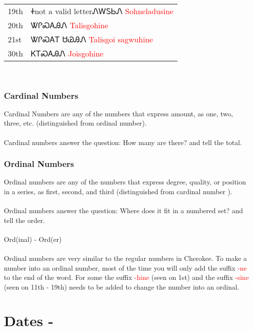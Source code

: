 \vfill\newpage\begin{minipage}{\linewidth}\begin{tabular}{p{5cm} p{9cm}}
19th & Ꮠnot a valid letterᏁᎳᏚᏏᏁ 
 \newline \textcolor{red}{Sohneladusine}\\
20th & ᏔᎵᏍᎪᎯᏁ 
 \newline \textcolor{red}{Talisgohine}\\
21st & ᏔᎵᏍᎪᎢ ᏌᏊᎯᏁ 
 \newline \textcolor{red}{Talisgoi sagwuhine}\\
30th & ᏦᎢᏍᎪᎯᏁ 
 \newline \textcolor{red}{Joisgohine}\\
\end{tabular}
\end{minipage}

\
\subsection{Cardinal Numbers}
Cardinal Numbers are any of the numbers that express amount, as one, two, three,  etc. (distinguished from ordinal number).\cite{cardinalNumbers}\\\\
Cardinal numbers answer the question: How many are there? and tell the total.\
\index{Ordinal Numbers}\subsection{Ordinal Numbers}
Ordinal numbers are any of the numbers that express degree, quality, or position in a series, as first, second, and third  (distinguished from cardinal number ).\cite{ordinalNumbers}\\\\
\noindent Ordinal numbers answer the question: Where does it fit in a numbered set? and tell the order.\\\\
\noindent Ord(inal) - Ord(er)\\\\
Ordinal numbers are very similar to the regular numbers in Cherokee. To make a number into an ordinal number, most of the time you will only add the suffix \textcolor{red}{-ne} to the end of the word. For some the suffix \textcolor{red}{-hine} (seen on 1st) and the suffix \textcolor{red}{-sine} (seen on 11th - 19th) needs to be added to change the number into an ordinal.\cite{walc141}
\index{}
\chapter*{Dates - }
